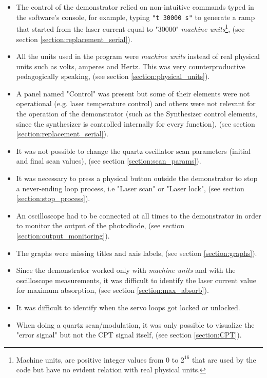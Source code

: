 \documentclass[a4paper,12pt]{article}
\begin{document}
\begin{itemize}
\itemsep 0em %
    \item The control of the demonstrator relied on non-intuitive commands typed in the software's console, for example, typing \texttt{"t 30000 s"} to generate a ramp that started from the laser current equal to "30000" \textit{machine units}\footnote{Machine units, are positive integer values from 0 to $2^{16}$ that are used by the code but have no evident relation with real physical units.}, (see section \ref{section:replacement_serial}).
    \item All the units used in the program were \textit{machine units} instead of real physical units such as volts, amperes and Hertz. This was very counterproductive pedagogically speaking, (see section \ref{section:physical_units}).
    \item A panel named "Control" was present but some of their elements were not operational (e.g. laser temperature control) and others were not relevant for the operation of the demonstrator (such as the Synthesizer control elements, since the synthesizer is controlled internally for every function), (see section \ref{section:replacement_serial}).
    \item It was not possible to change the quartz oscillator scan parameters (initial and final scan values), (see section \ref{section:scan_params}).
    \item It was necessary to press a physical button outside the demonstrator to stop a never-ending loop process, i.e "Laser scan" or "Laser lock", (see section \ref{section:stop_process}).
    \item An oscilloscope had to be connected at all times to the demonstrator in order to monitor the output of the photodiode, (see section \ref{section:output_monitoring}).
    \item The graphs were missing titles and axis labels, (see section \ref{section:graphs}).
    \item Since the demonstrator worked only with \textit{machine units} and with the oscilloscope measurements, it was difficult to identify the laser current value for maximum absorption, (see section \ref{section:max_absorb}).
    \item It was difficult to identify when the servo loops got locked or unlocked.
    \item When doing a quartz scan\slash modulation, it was only possible to visualize the "error signal" but not the CPT signal itself, (see section \ref{section:CPT}).
    
\end{itemize}
\end{document}
